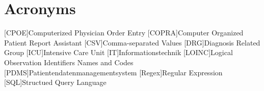 \chapter*{Acronyms}
    \begin{acronym}[loinccopra]
    	
    	[CPOE]{Computerized Physician Order Entry}
    	[COPRA]{Computer Organized Patient Report Assistant}
    	[CSV]{Comma-separated Values}
    	[DRG]{Diagnosis Related Group}
    	[ICU]{Intensive Care Unit}
    	[IT]{Informationstechnik}
    	[LOINC]{Logical Observation Identifiers Names and Codes}
    	[PDMS]{Patientendatenmanagementsystem}
    	[Regex]{Regular Expression}
    	[SQL]{Structued Query Language}
    	
    \end{acronym}